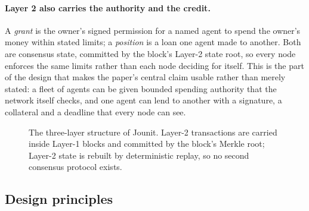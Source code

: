 \documentclass{article}
\begin{document}
\paragraph{Layer 2 also carries the authority and the credit.} A \emph{grant}
is the owner's signed permission for a named agent to spend the owner's money
within stated limits; a \emph{position} is a loan one agent made to another.
Both are consensus state, committed by the block's Layer-2 state root, so every
node enforces the same limits rather than each node deciding for itself. This
is the part of the design that makes the paper's central claim usable rather
than merely stated: a fleet of agents can be given bounded spending authority
that the network itself checks, and one agent can lend to another with a
signature, a collateral and a deadline that every node can see.

\begin{figure}[t]
\centering
{}
\caption{The three-layer structure of Jounit. Layer-2 transactions are carried
inside Layer-1 blocks and committed by the block's Merkle root; Layer-2 state is
rebuilt by deterministic replay, so no second consensus protocol exists.}
\label{fig:layers}
\end{figure}

\subsection{Design principles}
\end{document}
